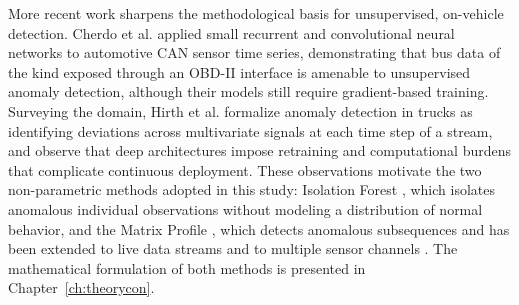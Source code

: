 More recent work sharpens the methodological basis for unsupervised, on-vehicle detection. Cherdo et al. \cite{cherdo2023can_anomaly} applied small recurrent and convolutional neural networks to automotive CAN sensor time series, demonstrating that bus data of the kind exposed through an OBD-II interface is amenable to unsupervised anomaly detection, although their models still require gradient-based training. Surveying the domain, Hirth et al. \cite{hirth2025truck_survey} formalize anomaly detection in trucks as identifying deviations across multivariate signals at each time step of a stream, and observe that deep architectures impose retraining and computational burdens that complicate continuous deployment. These observations motivate the two non-parametric methods adopted in this study: Isolation Forest \cite{liu2008isolation_forest}, which isolates anomalous individual observations without modeling a distribution of normal behavior, and the Matrix Profile \cite{yeh2016matrix_profile}, which detects anomalous subsequences and has been extended to live data streams \cite{lu2022matrix_profile_xxiv} and to multiple sensor channels \cite{yeh2024matrix_profile_multidim}. The mathematical formulation of both methods is presented in Chapter~\ref{ch:theorycon}.

